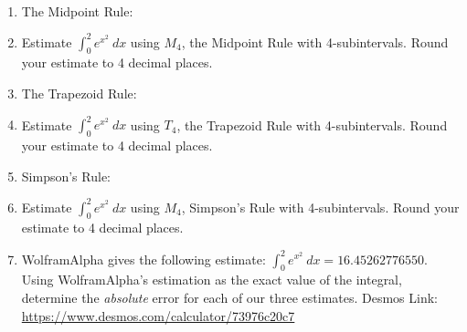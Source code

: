 \documentclass[11pt,fleqn]{article}
\begin{document}
\renewcommand{\headrulewidth}{0pt}
\newcommand{\blank}[1]{\rule{#1}{0.75pt}}
\newcommand{\bc}{\begin{center}}
\newcommand{\ec}{\end{center}}
\renewcommand{\d}{\displaystyle}

\vspace*{-0.7in}

\begin{center}
  \large
  \\
   
\end{center}

\begin{enumerate}
\item The Midpoint Rule:\\

\vspace{1in}

\item Estimate {\large{$\displaystyle{\int_0^2 e^{x^2} \: dx }$}} using $M_4$, the Midpoint Rule with 4-subintervals. Round your estimate to 4 decimal places.\\

\vfill

\item The Trapezoid Rule:\\

\vspace{1in}

\item Estimate {\large{$\displaystyle{\int_0^2 e^{x^2} \: dx }$}} using $T_4$, the Trapezoid Rule with 4-subintervals. Round your estimate to 4 decimal places.\\

\vfill
\newpage
\item Simpson's Rule:\\

\vspace{2in}

\item Estimate {\large{$\displaystyle{\int_0^2 e^{x^2} \: dx }$}} using $M_4$, Simpson's Rule with 4-subintervals. Round your estimate to 4 decimal places.\\

\vfill

\item WolframAlpha gives the following estimate: {\large{$\displaystyle{\int_0^2 e^{x^2} \: dx=16.45262776550}$}}. Using WolframAlpha's estimation as the exact value of the integral, determine the \emph{absolute} error for each of our three estimates.
\vfill
Desmos Link: \url{https://www.desmos.com/calculator/73976c20c7}
\end{enumerate}
\end{document}
